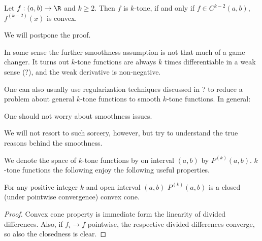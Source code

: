 \begin{lause}\label{k-tone_smooth}
	Let $f : (a, b) \to \R$ and $k \geq 2$. Then $f$ is $k$-tone, if and only if $f \in C^{k - 2}(a, b)$, $f^{(k - 2)}(x)$ is convex.
\end{lause}

We will postpone the proof.

In some sense the further smoothness assumption is not that much of a game changer. It turns out $k$-tone functions are always $k$ times differentiable in a weak sense (?), and the weak derivative is non-negative.

One can also usually use regularization techniques discussed in ? to reduce a problem about general $k$-tone functions to smooth $k$-tone functions. In general:

\begin{phil}
	One should not worry about smoothness issues.
\end{phil}

We will not resort to such sorcery, however, but try to understand the true reasons behind the smoothness.

We denote the space of $k$-tone functions by on interval $(a, b)$ by $P^{(k)}(a, b)$. $k$-tone functions the following enjoy the following useful properties.

\begin{prop}
	For any positive integer $k$ and open interval $(a, b)$ $P^{(k)}(a, b)$ is a closed (under pointwise convergence) convex cone.
\end{prop}
\begin{proof}
	Convex cone property is immediate form the linearity of divided differences. Also, if $f_{i} \to f$ pointwise, the respective divided differences converge, so also the closedness is clear.
\end{proof}


